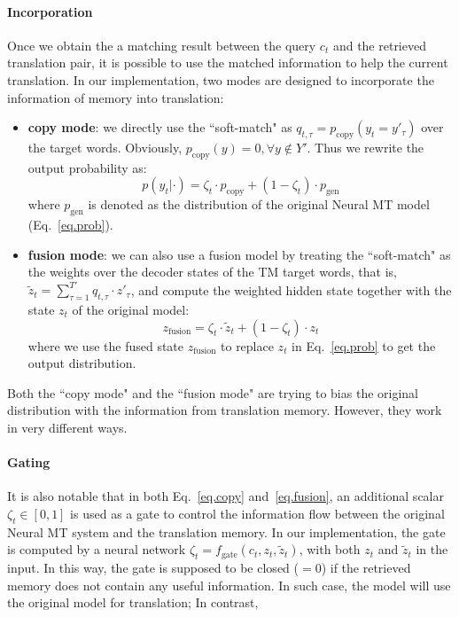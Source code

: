 \documentclass[11pt,letterpaper]{article}
\begin{document}
\paragraph{Incorporation} Once we obtain the a matching result between the query $c_t$ and the retrieved translation pair, it is possible to use the matched information to help the current translation. In our implementation, two modes are designed to incorporate the information of memory into translation:
\begin{itemize}
	\vspace{-5pt}
	\item \textbf{copy mode}: we directly use the ``soft-match" as $q_{t,\tau}=p_{\text{copy}}(y_t =y'_\tau)$ over the target words. Obviously, $p_{\text{copy}}(y) = 0, \forall y \notin Y'$. Thus we rewrite the output probability as:
	\begin{equation}
	\label{eq.copy}
		p(y_t|\cdot) = \zeta_t \cdot p_{\text{copy}} + (1 -\zeta_t) \cdot p_{\text{gen}}   
	\end{equation}
	where $p_{\text{gen}}$ is denoted as the distribution of the original Neural MT model (Eq.~\ref{eq.prob}).
	\vspace{-5pt}
	\item \textbf{fusion mode}: we can also use a fusion model by treating the ``soft-match" as the weights over the decoder states of the TM target words, that is, 
		$\tilde{z}_t = \sum_{\tau=1}^{T'} q_{t, \tau} \cdot z'_\tau$, and compute the weighted hidden state together with the state $z_t$ of the original model:
		\begin{equation}
		\label{eq.fusion}
		z_{\text{fusion}} = \zeta_t \cdot \tilde{z}_t + (1 -\zeta_t) \cdot z_t 
		\end{equation}
where we use the fused state $z_{\text{fusion}}$ to replace $z_t$ in Eq.~\ref{eq.prob} to get the output distribution.	
\vspace{-5pt}
\end{itemize}
Both the 	``copy mode" and the ``fusion mode" are trying to bias the original distribution with the information from translation memory. However, they work in very different ways. 
\paragraph{Gating} It is also notable that in both Eq.~\ref{eq.copy} and~\ref{eq.fusion}, an additional scalar $\zeta_t \in [0, 1]$ is used as a gate to control the information flow between the original Neural MT system and the translation memory. In our implementation, the gate is computed by a neural network $\zeta_t = f_{\text{gate}}(c_t, z_t, \tilde{z}_t)$, with both $z_t$ and $\tilde{z}_t$ in the input. In this way, the gate is supposed to be closed ($=0$) if the retrieved memory does not contain any useful information. In such case, the model will use the original model for translation; In contrast, 
\end{document}
